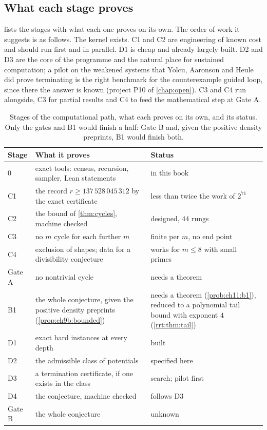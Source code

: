 \subsection{What each stage proves}

 lists the stages with what each one proves on its
own. The order of work it suggests is as follows. The kernel exists. C1 and C2
are engineering of known cost and should run first and in parallel. D1 is
cheap and already largely built. D2 and D3 are the core of the programme and
the natural place for sustained computation; a pilot on the weakened systems
that Yolcu, Aaronson and Heule did prove terminating is the right benchmark
for the counterexample guided loop, since there the answer is known
(project P10 of \cref{chap:open}). C3 and C4 run alongside, C3 for partial
results and C4 to feed the mathematical step at Gate A.

\begin{table}[!htbp]
\centering\small
\setlength{\tabcolsep}{3pt}
\caption{Stages of the computational path, what each proves on its own, and
its status. Only the gates and B1 would finish a half: Gate B and, given the positive density preprints, B1 would finish both.}
\label{tab:ch10d:milestones}
\begin{tabular}{@{}l>{\raggedright\arraybackslash}p{}>{\raggedright\arraybackslash}p{}@{}}
\toprule
Stage & What it proves & Status \\
\midrule
0 & exact tools: census, recursion, sampler, Lean statements & in this book \\
C1 & the record $r\ge137\,528\,045\,312$ by the exact certificate & less than twice the work of $2^{71}$ \\
C2 & the bound of \cref{thm:cycles}, machine checked & designed, $44$ rungs \\
C3 & no $m$ cycle for each further $m$ & finite per $m$, no end point \\
C4 & exclusion of shapes; data for a divisibility conjecture & works for $m\le8$ with small primes \\
Gate A & no nontrivial cycle & needs a theorem \\
B1 & the whole conjecture, given the positive density preprints (\cref{prop:ch9b:bounded}) & needs a theorem (\cref{prob:ch11:b1}), reduced to a polynomial tail bound with exponent $4$ (\cref{rrt:thm:tail}) \\
D1 & exact hard instances at every depth & built \\
D2 & the admissible class of potentials & specified here \\
D3 & a termination certificate, if one exists in the class & search; pilot first \\
D4 & the conjecture, machine checked & follows D3 \\
Gate B & the whole conjecture & unknown \\
\bottomrule
\end{tabular}
\end{table}

